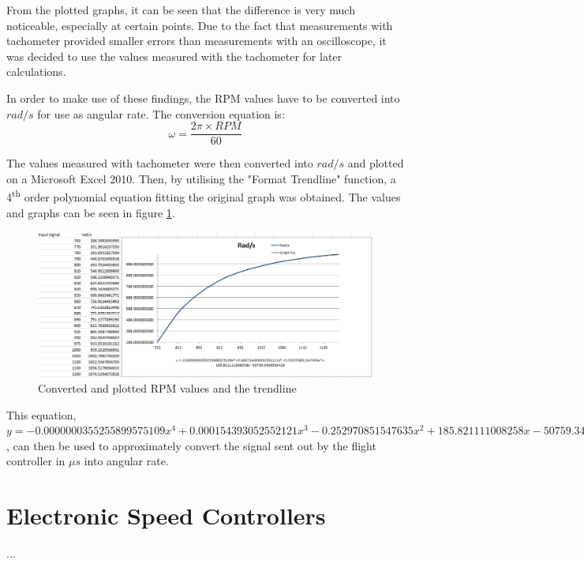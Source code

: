 From the plotted graphs, it can be seen that the difference is very much noticeable, especially at certain points. Due to the fact that measurements with tachometer provided smaller errors than measurements with an oscilloscope, it was decided to use the values measured with the tachometer for later calculations.

In order to make use of these findings, the RPM values have to be converted into $rad/s$ for use as angular rate. The conversion equation is:
\begin{equation}
\label{RPMConvert}
	\omega = \frac{2\pi \times RPM}{60}
\end{equation}

The values measured with tachometer were then converted into $rad/s$ and plotted on a Microsoft Excel 2010. Then, by utilising the "Format Trendline" function, a 4\textsuperscript{th} order polynomial equation fitting the original graph was obtained. The values and graphs can be seen in figure \ref{RadsTrendline}.

\begin{figure}[H]
  \centering
    \includegraphics[width=1\textwidth]{images/RadsTrendline.png}
	\caption{Converted and plotted RPM values and the trendline}
	\label{RadsTrendline}
\end{figure}

This equation, $y = -0.0000000355255899575109x^4 + 0.000154393052552121x^3 - 0.252970851547635x^2 + 185.821111008258x - 50759.3409352418$, can then be used to approximately convert the signal sent out by the flight controller in $\mu s$ into angular rate.

\section{Electronic Speed Controllers}

...


